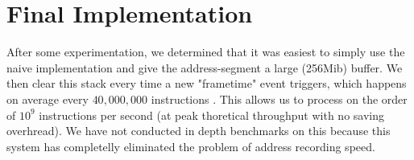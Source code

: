 \section{Final Implementation}
After some experimentation, we determined that it was easiest to simply use the naive implementation and give the address-segment a large (256Mib) buffer. We then clear this stack every time a new "frametime" event triggers, which happens on average every $40,000,000$ instructions \cite[Scheduler.h:72]{librr-src}. This allows us to process on the order of $10^9$ instructions per second (at peak thoretical throughput with no saving overhread). We have not conducted in depth benchmarks on this because this system has completelly eliminated the problem of address recording speed. 


